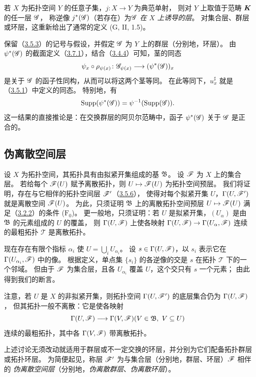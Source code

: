 若 $X$ 为拓扑空间 $Y$ 的任意子集，$j\colon X\to Y$ 为典范单射，
则对 $Y$ 上取值于范畴 $\boldsymbol K$ 的任一层 $\mathscr G$，
称逆像 $j^*(\mathscr G)$（若存在）为\emph{$\mathscr G$ 在 $X$ 上诱导的层}。
对集合层、群层或环层，这重新给出了通常的定义 (G, II, 1.5)。

保留（\hyperlink{para:0:3.5.3}{3.5.3}）的记号与假设，并假定 $\mathscr G$ 为 $Y$ 上的群层（分别地，环层）。
由 $\psi^*(\mathscr G)$ 的截面定义（\hyperlink{para:0:3.7.1}{3.7.1}），结合（\hyperlink{para:0:3.4.4}{3.4.4}）可知，茎的同态
\[
 \psi_x\circ\rho_{\psi(x)}\colon
 \mathscr G_{\psi(x)}\longrightarrow(\psi^*(\mathscr G))_x
\]
是关于 $\mathscr G$ 的函子性同构，从而可以将这两个茎等同。
在此等同下，$u_x^\sharp$ 就是（\hyperlink{para:0:3.5.1}{3.5.1}）中定义的同态。
特别地，有
\[
 \operatorname{Supp}(\psi^*(\mathscr G))=\psi^{-1}(\operatorname{Supp}(\mathscr G)).
\]
这一结果的直接推论是：在交换群层的阿贝尔范畴中，函子 $\psi^*(\mathscr G)$ 关于 $\mathscr G$ 是正合的。

\subsection{伪离散空间层}\hypertarget{heading:0:3.8}{}

设 $X$ 为拓扑空间，其拓扑具有由拟紧开集组成的基 $\mathfrak B$。
设 $\mathscr F$ 为 $X$ 上的集合层。
若给每个 $\mathscr F(U)$ 赋予离散拓扑，则 $U\mapsto\mathscr F(U)$ 为拓扑空间预层。
我们将证明，存在与它相伴的拓扑空间层 $\mathscr F'$（\hyperlink{para:0:3.5.6}{3.5.6}），
使得对每个拟紧开集 $U$，$\Gamma(U,\mathscr F')$ 就是离散空间 $\mathscr F(U)$。
为此，只须证明 $\mathfrak B$ 上的离散拓扑空间预层 $U\mapsto\mathscr F(U)$ 满足（\hyperlink{para:0:3.2.2}{3.2.2}）的条件 ($\mathrm F_0$)。
更一般地，只须证明：若 $U$ 是拟紧开集，$(U_\alpha)$ 是由 $\mathfrak B$ 的元素组成的 $U$ 的覆盖，
则 $\Gamma(U,\mathscr F)$ 上使各映射 $\Gamma(U,\mathscr F)\to\Gamma(U_\alpha,\mathscr F)$ 连续的最粗拓扑
$\mathscr T$ 是离散拓扑。

现在存在有限个指标 $\alpha_i$ 使 $U=\bigcup_i U_{\alpha_i}$。
设 $s\in\Gamma(U,\mathscr F)$，以 $s_i$ 表示它在 $\Gamma(U_{\alpha_i},\mathscr F)$ 中的像。
根据定义，单点集 $\{s_i\}$ 的各逆像的交是 $s$ 在拓扑 $\mathscr T$ 下的一个邻域。
但由于 $\mathscr F$ 为集合层，且各 $U_{\alpha_i}$ 覆盖 $U$，这个交只有 $s$ 一个元素；
由此得到我们的断言。

注意，若 $U$ 是 $X$ 的非拟紧开集，则拓扑空间 $\Gamma(U,\mathscr F')$ 的底层集合仍为 $\Gamma(U,\mathscr F)$，
但其拓扑一般不离散：它是使各映射
\[
 \Gamma(U,\mathscr F)\longrightarrow\Gamma(V,\mathscr F)
 (V\in\mathfrak B,\ V\subseteq U)
\]
连续的最粗拓扑，其中各 $\Gamma(V,\mathscr F)$ 带离散拓扑。

上述讨论无须改动就适用于群层或不一定交换的环层，并分别为它们配备拓扑群层或拓扑环层。
为简便起见，称层 $\mathscr F'$ 为与集合层（分别地，群层、环层）$\mathscr F$ 相伴的
\emph{伪离散空间层}（分别地，\emph{伪离散群层}、\emph{伪离散环层}）。

